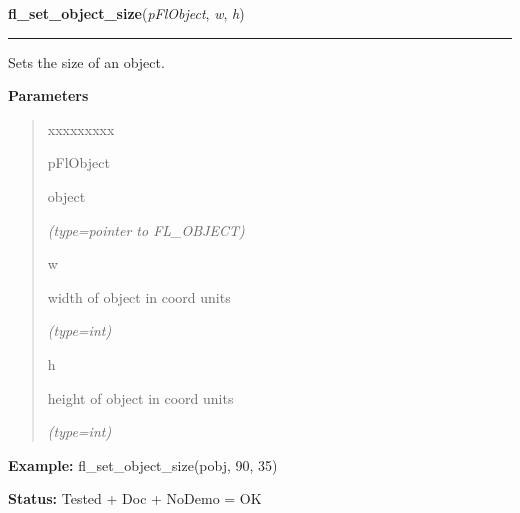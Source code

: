 \hspace{.8\funcindent}\begin{boxedminipage}{\funcwidth}

    \raggedright \textbf{fl\_set\_object\_size}(\textit{pFlObject}, \textit{w}, \textit{h})

    \vspace{-1.5ex}

    \rule{\textwidth}{0.5\fboxrule}
\setlength{\parskip}{2ex}
    Sets the size of an object.

\setlength{\parskip}{1ex}
      \textbf{Parameters}
      \vspace{-1ex}

      \begin{quote}
        \begin{Ventry}{xxxxxxxxx}

          \item[pFlObject]

          object

            {\it (type=pointer to FL\_OBJECT)}

          \item[w]

          width of object in coord units

            {\it (type=int)}

          \item[h]

          height of object in coord units

            {\it (type=int)}

        \end{Ventry}

      \end{quote}

\textbf{Example:} fl\_set\_object\_size(pobj, 90, 35)



\textbf{Status:} Tested + Doc + NoDemo = OK



    \end{boxedminipage}

    \label{xformslib:flbasic:fl_set_object_automatic}

    \vspace{0.5ex}

